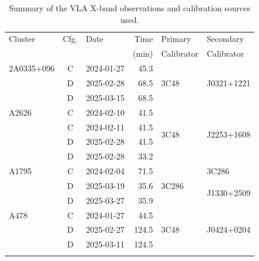 \begin{table}[p]
    \centering
    \begingroup
        \footnotesize
        \setlength{\tabcolsep}{6pt}
        \renewcommand{\arraystretch}{0.9}

        \begin{threeparttable}
            \caption{Summary of the VLA X-band observations and calibration sources used.}
            \label{tab:observations}
            \begin{tabular}{@{}l c l r l l@{}}
                \toprule
                Cluster & Cfg. & Date & Time & Primary & Secondary \\
                 & &  & (min) & Calibrator & Calibrator \\
                \midrule

                2A0335+096    & C & 2024-01-27 & 45.3  & \multirow{3}{*}{3C48}  & \multirow{3}{*}{J0321+1221} \\
                            & D & 2025-02-28 & 68.5  &                        &                             \\
                            & D & 2025-03-15 & 68.5  &                        &                             \\
                \addlinespace[0.25em]

                A2626         & C & 2024-02-10 & 41.5  & \multirow{4}{*}{3C48}  & \multirow{4}{*}{J2253+1608} \\
                            & C & 2024-02-11 & 41.5  &                        &                             \\
                            & D & 2025-02-28 & 41.5  &                        &                             \\
                            & D & 2025-02-28 & 33.2  &                        &                             \\
                \addlinespace[0.25em]

                A1795         & C & 2024-02-04 & 71.5  & \multirow{3}{*}{3C286} & 3C286\tnote{a}               \\
                            & D & 2025-03-19 & 35.6  &                        & \multirow{2}{*}{J1330+2509}  \\
                            & D & 2025-03-27 & 35.9  &                        &                             \\
                \addlinespace[0.25em]

                A478          & C & 2024-01-27 & 44.5  & \multirow{3}{*}{3C48}  & \multirow{3}{*}{J0424+0204} \\
                            & D & 2025-02-27 & 124.5 &                        &                             \\
                            & D & 2025-03-11 & 124.5 &                        &                             \\
                \addlinespace[0.25em]


\end{tabular}
\end{threeparttable}
\end{table}
